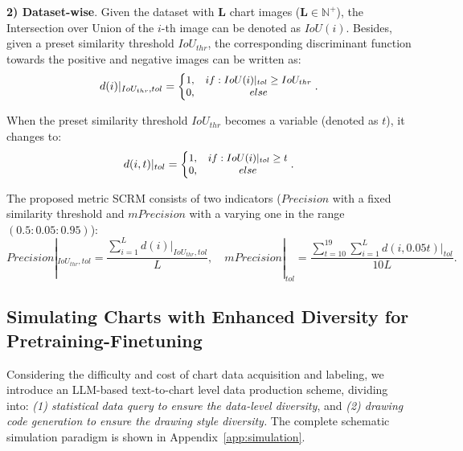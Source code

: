 \documentclass{article} \usepackage{iclr2024_conference,times}
\begin{document}
\textbf{2) Dataset-wise}. Given the dataset with {\small $\mathbf{L}$} chart images ({\small $\mathbf{L}\in \mathbb{{N}^+}$}), the Intersection over Union of the {\small $i$-th} image can be denoted as {\small $IoU(i)$}. Besides, given a preset similarity threshold {\small $IoU_{thr}$}, the corresponding discriminant function towards the positive and negative images can be written as:
\begin{equation}
\small
d(i)|_{IoU_{thr},tol}=\left\{\begin{matrix}
  1,& if: IoU(i)|_{tol} \ge IoU_{thr} \\
  0,& else
\end{matrix}\right..
\end{equation}

When the preset similarity threshold {\small $IoU_{thr}$} becomes a variable (denoted as $t$), it changes to:
\begin{equation}
\small
d(i, t)|_{tol}=\left\{\begin{matrix}
  1,& if: IoU(i)|_{tol} \ge t \\
  0,& else
\end{matrix}\right..
\end{equation}

The proposed metric SCRM consists of two indicators ($Precision$ with a fixed similarity threshold and $mPrecision$ with a varying one in the range {\small $(0.5:0.05:0.95)$}):
\begin{equation}
Precision|_{IoU_{thr},tol}=\frac{\sum_{i=1}^{L}d(i)|_{IoU_{thr},tol}}{L},
\quad 
\label{eqa:mprecison}
mPrecision|_{tol}=\frac{\sum_{t=10}^{19}\sum_{i=1}^{L}d(i,0.05t)|_{tol}}{10L} .
\end{equation}


\vspace{-8pt}
\subsection{Simulating Charts with Enhanced Diversity for Pretraining-Finetuning}
\vspace{-8pt}
\label{sec:simulate}
Considering the difficulty and cost of chart data acquisition and labeling, we introduce an LLM-based text-to-chart level data production scheme, dividing into: \textit{(1) statistical data query to ensure the data-level diversity}, and \textit{(2) drawing code generation to ensure the drawing style diversity.} The complete schematic simulation paradigm is shown in Appendix~\ref{app:simulation}.
\end{document}
